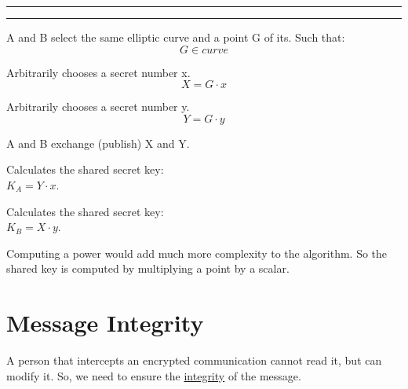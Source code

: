 \begin{multicols}{2}
    \begin{center}
        \vspace{0.2cm}
        \hrule
    \end{center}

\columnbreak
\columnseprule=1pt

    \begin{center}
        \vspace{0.2cm}
        \hrule
    \end{center}
    
\end{multicols}

\begin{center}
    A and B select the same elliptic curve and a point G of its. Such that:
    \[
         G \in curve
    \]
\end{center}

\begin{multicols}{2}
    \centering
    Arbitrarily chooses a secret number x.
    \[
        X= G \cdot x
    \]
    \columnseprule=1pt
    \columnbreak
    
    Arbitrarily chooses a secret number y.
    \[
        Y= G \cdot y
    \]
\end{multicols}

\begin{center}
    A and B exchange (publish) X and Y.
\end{center}

\begin{multicols}{2}
    \centering
    Calculates the shared secret key: \\ $K_A = Y \cdot x$.
    
    \columnseprule=1pt
    \columnbreak

    Calculates the shared secret key: \\ $K_B = X\cdot y$.
\end{multicols}

\begin{tcolorbox}[colback=blue!10!white, colframe=blue!50!white]
    Computing a power would add much more complexity to the algorithm. So the shared key is computed by multiplying a point by a scalar.
\end{tcolorbox}

\section{Message Integrity}
A person that intercepts an encrypted communication cannot read it, but can modify it. So, we need to ensure the \underline{integrity} of the message.

